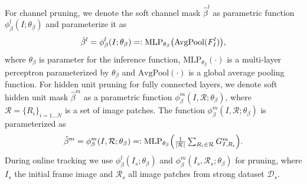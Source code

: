 \documentclass[letterpaper]{article} %
\newcommand{\eqdef}{=\vcentcolon}
\DeclareMathOperator*{\argmin}{arg\,min}
\begin{document}
For channel pruning, we denote the soft channel mask $\hat{\beta}^l$ as parametric function $\phi^l_\beta(I;\theta_\beta)$ and parameterize it as
\begin{equation}
    \hat{\beta}^l=\phi^l_\beta(I;\theta_\beta) \eqdef \text{MLP}_{\theta_\beta}\big(\text{AvgPool}(F^l_I)\big),
\end{equation}
where $\theta_\beta$ is parameter for the inference function, $\text{MLP}_{\theta_\beta}(\cdot)$ is a multi-layer perceptron parameterized by $\theta_\beta$ and $\text{AvgPool}(\cdot)$ is a global average pooling function.
For hidden unit pruning for fully connected layers, we denote soft hidden unit mask $\hat{\beta}^m$ as a parametric function $\phi^m_\beta(I, \mathcal{R};\theta_\beta)$, where $\mathcal{R}=\{R_i\}_{i=1...N}$ is a set of image patches.
The function $\phi^m_\beta(I, \mathcal{R};\theta_\beta)$ is parameterized as
\begin{equation}
    \hat{\beta}^m
    =\phi^m_\beta(I,\mathcal{R};\theta_\beta)
    \eqdef \textstyle\text{MLP}_{\theta_\beta}\Big(\frac{1}{|\mathcal{R}|}\sum_{R_i\in \mathcal{R}}G^m_{I,R_i}\Big).
\end{equation}
During online tracking we use $\phi^l_\beta(I_s;\theta_\beta)$ and $\phi^m_\beta(I_s, \mathcal{R}_s; \theta_\beta)$ for pruning, where $I_s$ the initial frame image and $\mathcal{R}_s$ all image patches from strong dataset $\mathcal{D}_s$.

















\end{document}
